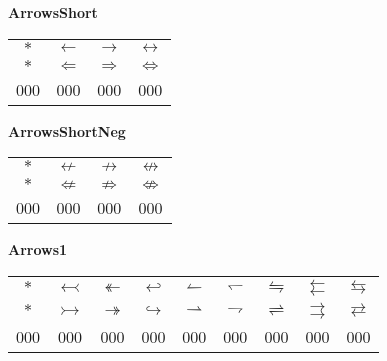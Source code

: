 \documentclass[12pt]{report}
\newlength{\mine}
\newlength{\niz}
\def\pmb{}
\begin{document}
\newpage

\textbf{ArrowsShort}
\par\nobreak\vspace{2mm}
\begin{tabular}{|c|ccc|}
  \hline
   $\pmb *              $&
   $\pmb\leftarrow      $&
   $\pmb\rightarrow     $&
   $\pmb\leftrightarrow $\\[\mine]
   $\pmb *              $&
   $\pmb\Leftarrow      $&
   $\pmb\Rightarrow     $&
   $\pmb\Leftrightarrow $\\[\niz]
  \hline\hline
  000&000&000&000\\
  \hline
\end{tabular}
\goodbreak\par\vspace{3mm}

\textbf{ArrowsShortNeg}
\par\nobreak\vspace{2mm}
\begin{tabular}{|c|ccc|}
  \hline
   $\pmb *               $&
   $\pmb\nleftarrow      $&
   $\pmb\nrightarrow     $&
   $\pmb\nleftrightarrow $\\[\mine]
   $\pmb *               $&
   $\pmb\nLeftarrow      $&
   $\pmb\nRightarrow     $&
   $\pmb\nLeftrightarrow $\\[\niz]
  \hline\hline
  000&000&000&000\\
  \hline
\end{tabular}
\goodbreak\par\vspace{3mm}

\textbf{Arrows1}
\par\nobreak\vspace{2mm}
\begin{tabular}{|c|cccccccc|}
  \hline
   $\pmb *                 $&
   $\pmb\leftarrowtail     $&
   $\pmb\twoheadleftarrow  $&
   $\pmb\hookleftarrow     $&
   $\pmb\leftharpoonup     $&
   $\pmb\leftharpoondown   $&
   $\pmb\leftrightharpoons $&
   $\pmb\leftleftarrows    $&
   $\pmb\leftrightarrows   $\\[\mine]
   $\pmb *                 $&
   $\pmb\rightarrowtail    $&
   $\pmb\twoheadrightarrow $&
   $\pmb\hookrightarrow    $&
   $\pmb\rightharpoonup    $&
   $\pmb\rightharpoondown  $&
   $\pmb\rightleftharpoons $&
   $\pmb\rightrightarrows  $&
   $\pmb\rightleftarrows   $\\[\niz]
  \hline\hline
  000&000&000&000&000&000&000&000&000\\
  \hline
\end{tabular}
\goodbreak\par\vspace{3mm}
\end{document}
